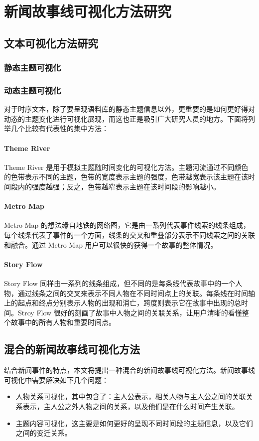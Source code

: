 \chapter{新闻故事线可视化方法研究}

\section{文本可视化方法研究}
\subsection{静态主题可视化}

\subsection{动态主题可视化}
对于时序文本，除了要呈现语料库的静态主题信息以外，更重要的是如何更好得对动态的主题变化进行可视化展现，而这也正是吸引广大研究人员的地方。下面将列举几个比较有代表性的集中方法：
\subsubsection{Theme River}
Theme River \cite{Havre:2000}是用于模拟主题随时间变化的可视化方法。主题河流通过不同颜色的色带表示不同的主题，色带的宽度表示主题的强度，色带越宽表示该主题在该时间段内的强度越强；反之，色带越窄表示主题在该时间段的影响越小。

\subsubsection{Metro Map}
Metro Map \cite{shahaf2012trains} 的想法缘自地铁的网络图，它是由一系列代表事件线索的线条组成，每个线条代表了事件的一个方面，线条的交叉和重叠部分表示不同线索之间的关联和融合。通过 Metro Map 用户可以很快的获得一个故事的整体情况。

\subsubsection{Story Flow}
Story Flow \cite{Liu:2013} 同样由一系列的线条组成，但不同的是每条线代表故事中的一个人物，通过线条之间的交叉来表示不同人物在不同时间点上的关联。每条线在时间轴上的起点和终点分别表示人物的出现和消亡，跨度则表示它在故事中出现的总时间。Stroy Flow 很好的刻画了故事中人物之间的关联关系，让用户清晰的看懂整个故事中的所有人物和重要时间点。

\section{混合的新闻故事线可视化方法}
结合新闻事件的特点，本文将提出一种混合的新闻故事线可视化方法。新闻故事线可视化中需要解决如下几个问题：
\begin{itemize}
\item 人物关系可视化，其中包含了：主人公表示，相关人物与主人公之间的关联关系表示，主人公之外人物之间的关系，以及他们是在什么时间产生关联。
\item 主题内容可视化，这主要是如何更好的呈现不同时间段的主题信息，以及它们之间的变迁关系。
\end{itemize}

